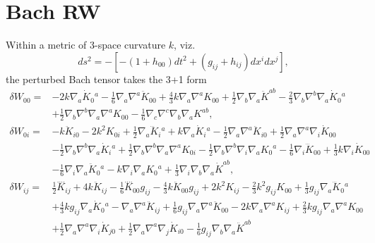 \documentclass[10pt,letterpaper]{article}
\numberwithin{equation}{subsection}
\begin{document}
\section{Bach RW}
Within a metric of 3-space curvature $k$, viz.
\begin{equation}
ds^2 = -\left[ -(1+h_{00})dt^2 + (g_{ij}+h_{ij})dx^i dx^j\right],
\end{equation}
the perturbed Bach tensor takes the 3+1 form
\begin{align}
\delta W_{00}={}&-2 k \nabla_{a}\dot{K}_{0}{}^{a}
 -  \tfrac{1}{6} \nabla_{a}\nabla^{a}\ddot{K}_{00}
 + \tfrac{4}{3} k \nabla_{a}\nabla^{a}K_{00}
 + \tfrac{1}{2} \nabla_{b}\nabla_{a}\ddot{K}^{ab}
 -  \tfrac{2}{3} \nabla_{b}\nabla^{b}\nabla_{a}\dot{K}_{0}{}^{a}\nonumber\\
& + \tfrac{1}{2} \nabla_{b}\nabla^{b}\nabla_{a}\nabla^{a}K_{00}
 -  \tfrac{1}{6} \nabla_{c}\nabla^{c}\nabla_{b}\nabla_{a}K^{ab},
\\
\delta W_{0i}={}&- k \ddot{K}_{i0}
 - 2 k^2 K_{0i}
 + \tfrac{1}{2} \nabla_{a}\dddot{K}_{i}{}^{a}
 + k \nabla_{a}\dot{K}_{i}{}^{a}
 -  \tfrac{1}{2} \nabla_{a}\nabla^{a}\ddot{K}_{i0}
 + \tfrac{1}{2} \nabla_{a}\nabla^{a}\nabla_{i}\dot{K}_{00}\nonumber\\
& -  \tfrac{1}{2} \nabla_{b}\nabla^{b}\nabla_{a}\dot{K}_{i}{}^{a}
 + \tfrac{1}{2} \nabla_{b}\nabla^{b}\nabla_{a}\nabla^{a}K_{0i}
 -  \tfrac{1}{2} \nabla_{b}\nabla^{b}\nabla_{i}\nabla_{a}K_{0}{}^{a}
 -  \tfrac{1}{6} \nabla_{i}\dddot{K}_{00}
 + \tfrac{1}{3} k \nabla_{i}\dot{K}_{00}\nonumber\\
& -  \tfrac{1}{6} \nabla_{i}\nabla_{a}\ddot{K}_{0}{}^{a}
 -  k \nabla_{i}\nabla_{a}K_{0}{}^{a}
 + \tfrac{1}{3} \nabla_{i}\nabla_{b}\nabla_{a}\dot{K}^{ab},
\\
\delta W_{ij}={}&\tfrac{1}{2} \overset{\text{...}.}{K}_{ij}
 + 4 k \ddot{K}_{ij}
 -  \tfrac{1}{6} \overset{\text{...}.}{K}_{00} g_{ij}
 -  \tfrac{4}{3} k \ddot{K}_{00} g_{ij}
 + 2 k^2 K_{ij}
 -  \tfrac{2}{3} k^2 g_{ij} K_{00}
 + \tfrac{1}{3} g_{ij} \nabla_{a}\dddot{K}_{0}{}^{a}\nonumber\\
& + \tfrac{4}{3} k g_{ij} \nabla_{a}\dot{K}_{0}{}^{a}
 -  \nabla_{a}\nabla^{a}\ddot{K}_{ij}
 + \tfrac{1}{6} g_{ij} \nabla_{a}\nabla^{a}\ddot{K}_{00}
 - 2 k \nabla_{a}\nabla^{a}K_{ij}
 + \tfrac{2}{3} k g_{ij} \nabla_{a}\nabla^{a}K_{00}\nonumber\\
& + \tfrac{1}{2} \nabla_{a}\nabla^{a}\nabla_{i}\dot{K}_{j0}
 + \tfrac{1}{2} \nabla_{a}\nabla^{a}\nabla_{j}\dot{K}_{i0}
 -  \tfrac{1}{6} g_{ij} \nabla_{b}\nabla_{a}\ddot{K}^{ab}

\end{align}
\end{document}
